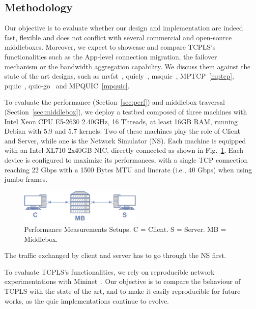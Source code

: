 \subsection{Methodology}

Our objective is to evaluate whether our design and implementation are indeed
fast, flexible and does not conflict with several commercial and open-source
middleboxes. Moreover, we expect to showcase and compare TCPLS's functionalities
such as the App-level connection migration, the failover mechanism or the
bandwidth aggregation capability. We discuss them against the state
of the art designs, such as mvfst~\cite{mvfast}, quicly~\cite{quicly},
msquic~\cite{msquic}, MPTCP~\ref{mptcp}, pquic~\cite{pquic},
quic-go~\cite{quic-go} and MPQUIC~\ref{mpquic}.

To evaluate the performance (Section~\ref{sec:perf}) and middlebox traversal
(Section~\ref{sec:middlebox}), we deploy a testbed composed of three machines with Intel Xeon CPU E5-2630
2.40GHz, 16 Threads, at least 16GB RAM, running Debian with 5.9 and
5.7 kernels. Two of these machines play the role of Client and Server,
while one is the Network Simulator (NS). Each machine is equipped with an
Intel XL710 2x40GB NIC, directly connected as shown in
Fig.~\ref{fig:perf_testbed}.
Each device is configured to maximize its performances, with a single TCP connection
reaching 22 Gbps with a 1500 Bytes MTU and linerate (i.e., 40 Gbps) when
using jumbo frames.

\begin{figure}[!t]
  \begin{center}
    \includegraphics[width=6cm]{figures/testbed.png}
  \end{center}
  \vspace{-0.5cm}
  \caption{Performance Measurements Setups. C = Client. S = Server. MB = Middlebox.}
  \label{fig:perf_testbed}
    \vspace{-0.5cm}
\end{figure}

The traffic exchanged by client and server has to go through the NS first.

To evaluate TCPLS's functionalities, we rely on reproducible network
experimentations with Mininet~\cite{mininet}. Our objective is to compare the
behaviour of TCPLS with the state of the art, and to make it easily
reproducible for future works, as the quic implementations continue to evolve.

